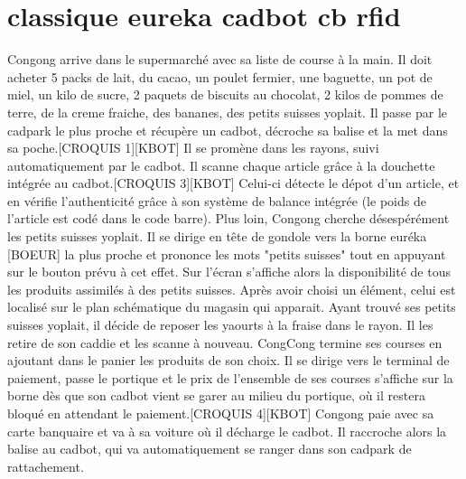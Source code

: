 \section{classique eureka cadbot cb rfid}

Congong arrive dans le supermarché avec sa liste de course à la main. Il doit acheter 5 packs de lait, du cacao, un poulet fermier, une baguette, un pot de miel, un kilo de sucre, 2 paquets de biscuits au chocolat, 2 kilos de pommes de terre, de la creme fraiche, des bananes, des petits suisses yoplait.
Il passe par le cadpark le plus proche et récupère un cadbot, décroche sa balise et la met dans sa poche.[CROQUIS 1][KBOT]
Il se promène dans les rayons, suivi automatiquement par le cadbot.
Il scanne chaque article grâce à la douchette intégrée au cadbot.[CROQUIS 3][KBOT]
Celui-ci détecte le dépot d'un article, et en vérifie l'authenticité grâce à son système 
de balance intégrée (le poids de l'article est codé dans le code barre).
Plus loin, Congong cherche désespérément les petits suisses yoplait.
Il se dirige en tête de gondole vers la borne euréka [BOEUR] la plus proche et prononce les mots "petits suisses" tout en appuyant sur le bouton prévu à cet effet.
Sur l'écran s'affiche alors la disponibilité de tous les produits assimilés à des petits suisses.
Après avoir choisi un élément, celui est localisé sur le plan schématique du magasin qui apparait.
Ayant trouvé ses petits suisses yoplait, il décide de reposer les yaourts à la fraise dans le rayon.
Il les retire de son caddie et les scanne à nouveau.
CongCong termine ses courses en ajoutant dans le panier les produits de son choix.
Il se dirige vers le terminal de paiement, passe le portique et le prix de l'ensemble de ses courses s'affiche sur la borne dès que son cadbot vient se garer au milieu du portique, où il restera bloqué en attendant le paiement.[CROQUIS 4][KBOT]
Congong paie avec sa carte banquaire et va à sa voiture où il décharge le cadbot.
Il raccroche alors la balise au cadbot, qui va automatiquement se ranger dans son cadpark de rattachement.



